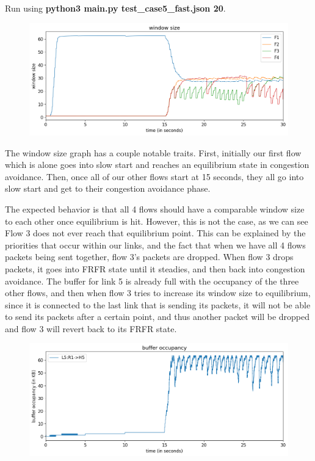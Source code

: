 \documentclass{article}
\begin{document}
Run using \textbf{python3 main.py test\_case5\_fast.json 20}.

\begin{figure}[H]
\centering
\includegraphics[width = \textwidth]{test_case5_fast window size.png}
\end{figure}


The window size graph has a couple notable traits. First, initially our first flow which is alone goes into slow start and reaches an equilibrium state in congestion avoidance. Then, once all of our other flows start at 15 seconds, they all go into slow start and get to their congestion avoidance phase. 

The expected behavior is that all 4 flows should have a comparable window size to each other once equilibrium is hit. However, this is not the case, as we can see Flow 3 does not ever reach that equilibrium point. This can be explained by the priorities that occur within our links, and the fact that when we have all 4 flows packets being sent together, flow 3's packets are dropped. When flow 3 drops packets, it goes into FRFR state until it steadies, and then back into congestion avoidance. The buffer for link 5 is already full with the occupancy of the three other flows, and then when flow 3 tries to increase its window size to equilibrium, since it is connected to the last link that is sending its packets, it will not be able to send its packets after a certain point, and thus another packet will be dropped and flow 3 will revert back to its FRFR state. 

\begin{figure}[H]
\centering
\includegraphics[width = \textwidth]{test_case5_fast buffer occupancy.png}
\end{figure}
\end{document}
